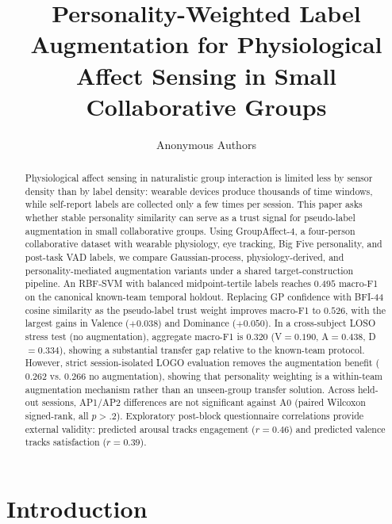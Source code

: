 \documentclass[sigconf,review,anonymous]{acmart}
\title{Personality-Weighted Label Augmentation for Physiological Affect Sensing
in Small Collaborative Groups}
\author{Anonymous Authors}
\affiliation{\institution{Anonymous Institution}}
\begin{document}
\begin{abstract}
Physiological affect sensing in naturalistic group interaction is limited less
by sensor density than by label density: wearable devices produce thousands of
time windows, while self-report labels are collected only a few times per
session.
This paper asks whether stable personality similarity can serve as a trust
signal for pseudo-label augmentation in small collaborative groups.
Using GroupAffect-4, a four-person collaborative dataset with wearable
physiology, eye tracking, Big Five personality, and post-task VAD labels, we
compare Gaussian-process, physiology-derived, and personality-mediated
augmentation variants under a shared target-construction pipeline.
An RBF-SVM with balanced midpoint-tertile labels reaches $0.495$ macro-F1 on
the canonical known-team temporal holdout.
Replacing GP confidence with BFI-44 cosine similarity as the pseudo-label
trust weight improves macro-F1 to $0.526$, with the largest gains in Valence
($+0.038$) and Dominance ($+0.050$).
In a cross-subject LOSO stress test (no augmentation), aggregate macro-F1 is
$0.320$ (V$=0.190$, A$=0.438$, D$=0.334$), showing a substantial transfer gap
relative to the known-team protocol.
However, strict session-isolated LOGO evaluation removes the augmentation
benefit ($0.262$ vs. $0.266$ no augmentation), showing that personality
weighting is a within-team augmentation mechanism rather than an unseen-group
transfer solution.
Across held-out sessions, AP1/AP2 differences are not significant against A0
(paired Wilcoxon signed-rank, all $p>.2$).
Exploratory post-block questionnaire correlations provide external validity:
predicted arousal tracks engagement ($r=0.46$) and predicted valence tracks
satisfaction ($r=0.39$).
\end{abstract}



\maketitle

\section{Introduction}
\label{sec:intro}
\end{document}

